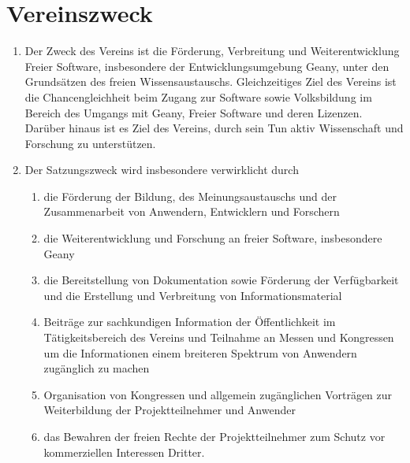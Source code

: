 \documentclass[fontsize=12pt,paper=a4,pagesize,headings=small]{scrartcl}
\begin{document}
\section{Vereinszweck}
\begin{enumerate}
    \item Der Zweck des Vereins ist die Förderung, Verbreitung und
    Weiterentwicklung Freier Software, insbesondere der
    Entwicklungsumgebung Geany, unter den Grundsätzen des freien
    Wissensaustauschs. Gleichzeitiges Ziel des Vereins ist die
    Chancengleichheit beim Zugang zur Software sowie Volksbildung im
    Bereich des Umgangs mit Geany, Freier Software und deren Lizenzen.
    Darüber hinaus ist es Ziel des Vereins, durch sein Tun aktiv
    Wissenschaft und Forschung zu unterstützen.

    \item Der Satzungszweck wird insbesondere verwirklicht durch

    \begin{enumerate}
        \item die Förderung der Bildung, des Meinungsaustauschs und der
        Zusammenarbeit von Anwendern, Entwicklern und Forschern

        \item die Weiterentwicklung und Forschung an freier Software,
        insbesondere Geany

        \item die Bereitstellung von Dokumentation sowie
        Förderung der Verfügbarkeit und die Erstellung und
        Verbreitung von Informationsmaterial

        \item Beiträge zur sachkundigen Information der Öffentlichkeit
        im Tätigkeitsbereich des Vereins und Teilnahme an Messen und
        Kongressen um die Informationen einem breiteren Spektrum von
        Anwendern zugänglich zu machen

        \item Organisation von Kongressen und allgemein zugänglichen
        Vorträgen zur Weiterbildung der Projektteilnehmer und Anwender

        \item das Bewahren der freien Rechte der Projektteilnehmer zum
        Schutz vor kommerziellen Interessen Dritter.
    \end{enumerate}
\end{enumerate}
\end{document}
